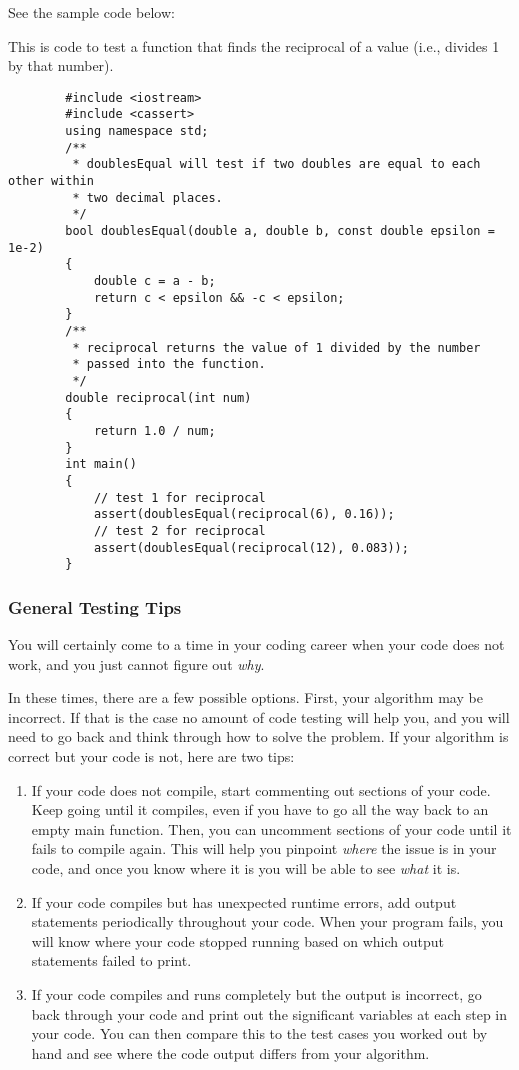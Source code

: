 See the sample code below:

\begin{example}
    This is code to test a function that finds the reciprocal of a value (i.e., divides 1 by that number).
    \begin{verbatim}
        #include <iostream>
        #include <cassert>
        using namespace std;
        /**
         * doublesEqual will test if two doubles are equal to each other within 
         * two decimal places.
         */
        bool doublesEqual(double a, double b, const double epsilon = 1e-2)
        {
            double c = a - b;
            return c < epsilon && -c < epsilon;
        }
        /**
         * reciprocal returns the value of 1 divided by the number 
         * passed into the function.
         */
        double reciprocal(int num)
        {
            return 1.0 / num;
        }
        int main()
        {
            // test 1 for reciprocal
            assert(doublesEqual(reciprocal(6), 0.16));
            // test 2 for reciprocal
            assert(doublesEqual(reciprocal(12), 0.083));
        }
    \end{verbatim}
\end{example}

\subsubsection{General Testing Tips}
You will certainly come to a time in your coding career when your code does not work, and you just cannot figure out \textit{why}.

In these times, there are a few possible options. First, your algorithm may be incorrect. If that is the case no amount of code testing will help you, and you will need to go back and think through how to solve the problem. If your algorithm is correct but your code is not, here are two tips:
\begin{enumerate}
    \item If your code does not compile, start commenting out sections of your code. Keep going until it compiles, even if you have to go all the way back to an empty main function. Then, you can uncomment sections of your code until it fails to compile again. This will help you pinpoint \textit{where} the issue is in your code, and once you know where it is you will be able to see \textit{what} it is. 
    \item If your code compiles but has unexpected runtime errors, add output statements periodically throughout your code. When your program fails, you will know where your code stopped running based on which output statements failed to print.
    \item If your code compiles and runs completely but the output is incorrect, go back through your code and print out the significant variables at each step in your code. You can then compare this to the test cases you worked out by hand and see where the code output differs from your algorithm.
\end{enumerate}

